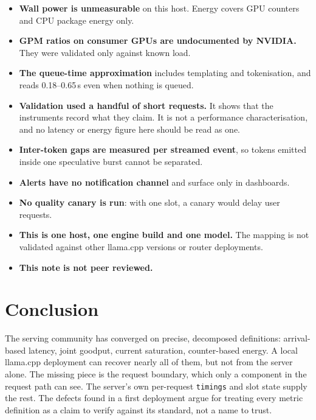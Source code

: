 \documentclass[11pt]{article}
\begin{document}
\begin{itemize}
\item \textbf{Wall power is unmeasurable} on this host. Energy covers GPU counters and CPU package
energy only.
\item \textbf{GPM ratios on consumer GPUs are undocumented by NVIDIA.} They were validated only
against known load.
\item \textbf{The queue-time approximation} includes templating and tokenisation, and reads
0.18--0.65\,s even when nothing is queued.
\item \textbf{Validation used a handful of short requests.} It shows that the instruments record what
they claim. It is not a performance characterisation, and no latency or energy figure here should be
read as one.
\item \textbf{Inter-token gaps are measured per streamed event}, so tokens emitted inside one
speculative burst cannot be separated.
\item \textbf{Alerts have no notification channel} and surface only in dashboards.
\item \textbf{No quality canary is run}: with one slot, a canary would delay user requests.
\item \textbf{This is one host, one engine build and one model.} The mapping is not validated against
other llama.cpp versions or router deployments.
\item \textbf{This note is not peer reviewed.}
\end{itemize}

\section{Conclusion}

The serving community has converged on precise, decomposed definitions: arrival-based latency, joint
goodput, current saturation, counter-based energy. A local llama.cpp deployment can recover nearly all
of them, but not from the server alone. The missing piece is the request boundary, which only a
component in the request path can see. The server's own per-request \texttt{timings} and slot state
supply the rest. The defects found in a first deployment argue for treating every metric definition
as a claim to verify against its standard, not a name to trust.



\end{document}
